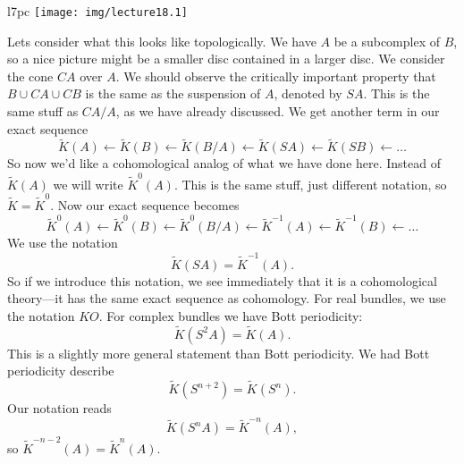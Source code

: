 \begin{wrapfigure}{l}{7pc}
  \vspace{-30pt}
  \texttt{[image: img/lecture18.1]}
\end{wrapfigure}
\noindent{}Lets consider what this looks like topologically. We
have $A$ be a subcomplex of $B$, so a nice picture might be a
smaller disc contained in a larger disc. We consider the cone
$CA$ over $A$. We should observe the critically important
property that $B\cup CA\cup CB$ is the same as the suspension of
$A$, denoted by $SA$. This is the same stuff as $CA/A$, as we
have already discussed. We get another term in our exact sequence
\begin{equation}
\widetilde{K}(A)\gets
\widetilde{K}(B)\gets
\widetilde{K}(B/A)\gets
\widetilde{K}(SA)\gets
\widetilde{K}(SB)\gets
\dots
\end{equation}
So now we'd like a cohomological analog of what we have done
here. Instead of $\widetilde{K}(A)$ we will write
$\widetilde{K}^{0}(A)$. This is the same stuff, just different
notation, so $\widetilde{K}=\widetilde{K}^{0}$. Now our exact
sequence becomes
\begin{equation}
\widetilde{K}^{0}(A)\gets
\widetilde{K}^{0}(B)\gets
\widetilde{K}^{0}(B/A)\gets
\widetilde{K}^{-1}(A)\gets
\widetilde{K}^{-1}(B)\gets
\dots
\end{equation}
We use the notation
\begin{equation}
\widetilde{K}(SA)=\widetilde{K}^{-1}(A).
\end{equation}
So if we introduce this notation, we see immediately that it is a
cohomological theory---it has the same exact sequence as
cohomology. For real bundles, we use the notation $KO$. For
complex bundles we have Bott periodicity:
\begin{equation}
\widetilde{K}(S^{2}A)=\widetilde{K}(A).
\end{equation}
This is a slightly more general statement than Bott
periodicity. We had Bott periodicity describe
\begin{equation}
\widetilde{K}(S^{n+2})=\widetilde{K}(S^{n}).
\end{equation}
Our notation reads
\begin{equation}
\widetilde{K}(S^{n}A)=\widetilde{K}^{-n}(A),
\end{equation}
so $\widetilde{K}^{-n-2}(A)=\widetilde{K}^{n}(A)$.
